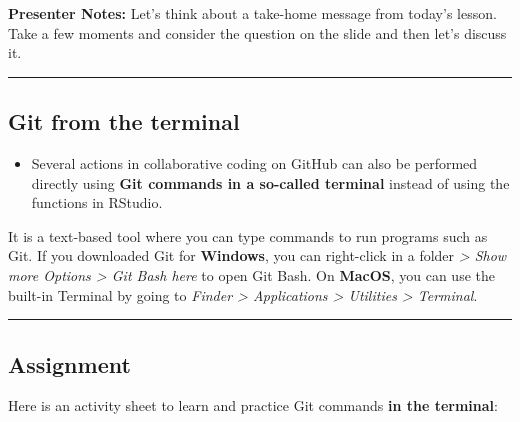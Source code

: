 \documentclass[
  letterpaper,
  DIV=11,
  numbers=noendperiod]{scrartcl}
\providecommand{\tightlist}{%
  \setlength{\itemsep}{0pt}\setlength{\parskip}{0pt}}
\begin{document}
\textbf{Presenter Notes:} Let's think about a take-home message from
today's lesson. Take a few moments and consider the question on the
slide and then let's discuss it.

\begin{center}\rule{0.5\linewidth}{0.5pt}\end{center}

\subsection{Git from the terminal}\label{git-from-the-terminal}

\begin{itemize}
\tightlist
\item
  Several actions in collaborative coding on GitHub can also be
  performed directly using \textbf{Git commands in a so-called terminal}
  instead of using the functions in RStudio.
\end{itemize}

\begin{tcolorbox}[enhanced jigsaw, colbacktitle=quarto-callout-tip-color!10!white, opacityback=0, leftrule=.75mm, colback=white, opacitybacktitle=0.6, colframe=quarto-callout-tip-color-frame, title=\textcolor{quarto-callout-tip-color}{\faLightbulb}\hspace{0.5em}{What is a \textbf{terminal}?}, left=2mm, titlerule=0mm, toptitle=1mm, breakable, bottomtitle=1mm, arc=.35mm, rightrule=.15mm, bottomrule=.15mm, toprule=.15mm, coltitle=black]

It is a text-based tool where you can type commands to run programs such
as Git. If you downloaded Git for \textbf{Windows}, you can right-click
in a folder \emph{\textgreater{} Show more Options \textgreater{} Git
Bash here} to open Git Bash. On \textbf{MacOS}, you can use the built-in
Terminal by going to \emph{Finder \textgreater{} Applications
\textgreater{} Utilities \textgreater{} Terminal}.

\end{tcolorbox}

\begin{center}\rule{0.5\linewidth}{0.5pt}\end{center}

\subsection{Assignment}\label{assignment}

Here is an activity sheet to learn and practice Git commands \textbf{in
the terminal}:
\end{document}

